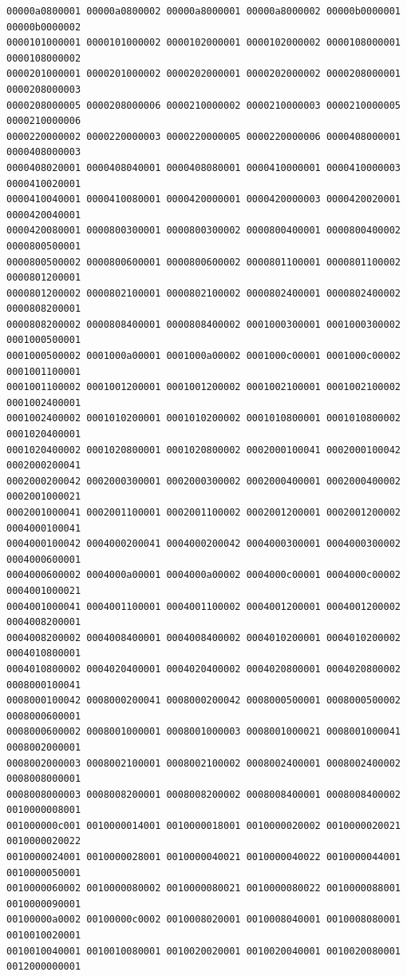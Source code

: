 \begin{Verbatim}[fontsize=\scriptsize]
00000a0800001 00000a0800002 00000a8000001 00000a8000002 00000b0000001 00000b0000002
0000101000001 0000101000002 0000102000001 0000102000002 0000108000001 0000108000002
0000201000001 0000201000002 0000202000001 0000202000002 0000208000001 0000208000003
0000208000005 0000208000006 0000210000002 0000210000003 0000210000005 0000210000006
0000220000002 0000220000003 0000220000005 0000220000006 0000408000001 0000408000003
0000408020001 0000408040001 0000408080001 0000410000001 0000410000003 0000410020001
0000410040001 0000410080001 0000420000001 0000420000003 0000420020001 0000420040001
0000420080001 0000800300001 0000800300002 0000800400001 0000800400002 0000800500001
0000800500002 0000800600001 0000800600002 0000801100001 0000801100002 0000801200001
0000801200002 0000802100001 0000802100002 0000802400001 0000802400002 0000808200001
0000808200002 0000808400001 0000808400002 0001000300001 0001000300002 0001000500001
0001000500002 0001000a00001 0001000a00002 0001000c00001 0001000c00002 0001001100001
0001001100002 0001001200001 0001001200002 0001002100001 0001002100002 0001002400001
0001002400002 0001010200001 0001010200002 0001010800001 0001010800002 0001020400001
0001020400002 0001020800001 0001020800002 0002000100041 0002000100042 0002000200041
0002000200042 0002000300001 0002000300002 0002000400001 0002000400002 0002001000021
0002001000041 0002001100001 0002001100002 0002001200001 0002001200002 0004000100041
0004000100042 0004000200041 0004000200042 0004000300001 0004000300002 0004000600001
0004000600002 0004000a00001 0004000a00002 0004000c00001 0004000c00002 0004001000021
0004001000041 0004001100001 0004001100002 0004001200001 0004001200002 0004008200001
0004008200002 0004008400001 0004008400002 0004010200001 0004010200002 0004010800001
0004010800002 0004020400001 0004020400002 0004020800001 0004020800002 0008000100041
0008000100042 0008000200041 0008000200042 0008000500001 0008000500002 0008000600001
0008000600002 0008001000001 0008001000003 0008001000021 0008001000041 0008002000001
0008002000003 0008002100001 0008002100002 0008002400001 0008002400002 0008008000001
0008008000003 0008008200001 0008008200002 0008008400001 0008008400002 0010000008001
001000000c001 0010000014001 0010000018001 0010000020002 0010000020021 0010000020022
0010000024001 0010000028001 0010000040021 0010000040022 0010000044001 0010000050001
0010000060002 0010000080002 0010000080021 0010000080022 0010000088001 0010000090001
00100000a0002 00100000c0002 0010008020001 0010008040001 0010008080001 0010010020001
0010010040001 0010010080001 0010020020001 0010020040001 0010020080001 0012000000001

\end{Verbatim}
